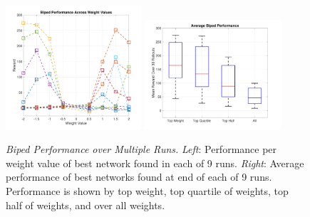 \begin{figure}[ht!]
\vskip -0.05in %
    \centering        
    \includegraphics[width=0.45\textwidth]{supplemental/biped_data/fitByWeight.pdf}   
    \includegraphics[width=0.45\textwidth]{supplemental/biped_data/fitByWeightBox.pdf}   
\vskip -0.05in %
    \caption      
    {     
	\textit{Biped Performance over Multiple Runs.}
	\newline
	\textit{Left}: Performance per weight value of best network found in each of 9 runs.
	\newline
	\textit{Right}: Average performance of best networks found at end of each of 9 runs. Performance is shown by top weight, top quartile of weights, top half of weights, and over all weights.
    }         
    \label{fig:biped}
\vskip -0.15in %
\end{figure}


